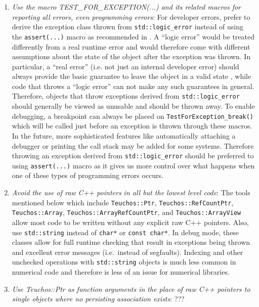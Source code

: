 \begin{enumerate}

{}\item\textit{Use the macro TEST\-\_FOR\-\_EXCEPTION(...) and its related
macros for reporting all errors, even programming errors}: For developer
errors, prefer to derive the exception class thrown from
{}\texttt{std\-::logic\-\_error} instead of using the {}\texttt{assert(...)}
macro as recommended in {}\cite[Item 68]{C++CodingStandards05}.  A ``logic
error'' would be treated differently from a real runtime error and would
therefore come with different assumptions about the state of the object after
the exception was thrown.  In particular, a ``real error'' (i.e. not just an
internal developer error) should always provide the basic guarantee to leave
the object in a valid state {}\cite[Item 71]{C++CodingStandards05}, while code
that throws a ``logic error'' can not make any such guarantees in general.
Therefore, objects that throw exceptions derived from
{}\texttt{std\-::logic\-\_error} should generally be viewed as unusable and
should be thrown away.  To enable debugging, a breakpoint can always be placed
on {}\texttt{Test\-For\-Exception\-\_break()} which will be called just before
an exception is thrown through these macros.  In the future, more
sophisticated features like automatically attaching a debugger or printing
the call stack may be added for some systems.  Therefore throwing an exception
derived from {}\texttt{std\-::logic\-\_error} should be preferred to using
{}\texttt{assert(...)} macro as it gives us more control over what happens
when one of these types of programming errors occurs.

{}\item\textit{Avoid the use of raw C++ pointers in all but the lowest level
code}: The tools mentioned below which include {}\texttt{Teuchos::\-Ptr},
{}\texttt{Teuchos::\-Ref\-Count\-Ptr}, {}\texttt{Teuchos::\-Array},
{}\texttt{Teuchos::\-Array\-Ref\-Count\-Ptr}, and
{}\texttt{Teuchos::\-Array\-View} allow most code to be written without any
explicit raw C++ pointers.  Also, use {}\texttt{std\-::string} instead of
{}\texttt{char*} or {}\texttt{const char*}.  In debug mode, these classes
allow for full runtime checking that result in exceptions being thrown and
excellent error messages (i.e.\ instead of segfaults).  Indexing and other
unchecked operations with {}\texttt{std\-::string} objects is much less common
in numerical code and therefore is less of an issue for numerical libraries.

{}\item\textit{Use Teuchos::Ptr as function arguments in the place of raw C++
pointers to single objects where no persisting association exists}: ???


\end{enumerate}
